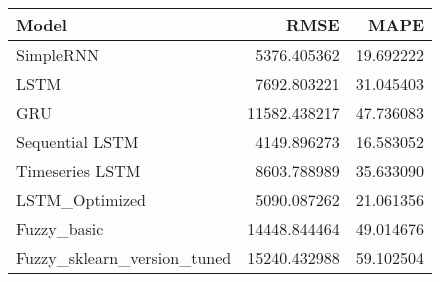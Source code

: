 \begin{tabular}{lrr}
\toprule
Model & RMSE & MAPE \\
\midrule
SimpleRNN & 5376.405362 & 19.692222 \\
LSTM & 7692.803221 & 31.045403 \\
GRU & 11582.438217 & 47.736083 \\
Sequential LSTM & 4149.896273 & 16.583052 \\
Timeseries LSTM & 8603.788989 & 35.633090 \\
LSTM_Optimized & 5090.087262 & 21.061356 \\
Fuzzy_basic & 14448.844464 & 49.014676 \\
Fuzzy_sklearn_version_tuned & 15240.432988 & 59.102504 \\
\bottomrule
\end{tabular}
